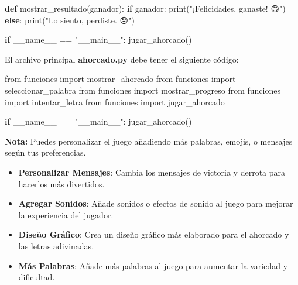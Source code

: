 \documentclass[
  a4paper,
  DIV=11,
  numbers=noendperiod,
  onepage,
  openany]{scrreprt}
\newenvironment{Shaded}{\begin{snugshade}}{\end{snugshade}}
\newcommand{\BuiltInTok}[1]{\textcolor[rgb]{0.00,0.23,0.31}{#1}}
\newcommand{\ControlFlowTok}[1]{\textcolor[rgb]{0.00,0.23,0.31}{\textbf{#1}}}
\newcommand{\ImportTok}[1]{\textcolor[rgb]{0.00,0.46,0.62}{#1}}
\newcommand{\KeywordTok}[1]{\textcolor[rgb]{0.00,0.23,0.31}{\textbf{#1}}}
\newcommand{\NormalTok}[1]{\textcolor[rgb]{0.00,0.23,0.31}{#1}}
\newcommand{\OperatorTok}[1]{\textcolor[rgb]{0.37,0.37,0.37}{#1}}
\newcommand{\StringTok}[1]{\textcolor[rgb]{0.13,0.47,0.30}{#1}}
\newcommand{\VariableTok}[1]{\textcolor[rgb]{0.07,0.07,0.07}{#1}}
\begin{document}
\begin{Shaded}
\begin{Highlighting}[]
\KeywordTok{def}\NormalTok{ mostrar\_resultado(ganador):}
    \ControlFlowTok{if}\NormalTok{ ganador:}
        \BuiltInTok{print}\NormalTok{(}\StringTok{"¡Felicidades, ganaste! 😄"}\NormalTok{)}
    \ControlFlowTok{else}\NormalTok{:}
        \BuiltInTok{print}\NormalTok{(}\StringTok{"Lo siento, perdiste. 😞"}\NormalTok{)}

\ControlFlowTok{if} \VariableTok{\_\_name\_\_} \OperatorTok{==} \StringTok{"\_\_main\_\_"}\NormalTok{:}
\NormalTok{    jugar\_ahorcado()}
\end{Highlighting}
\end{Shaded}

El archivo principal \textbf{ahorcado.py} debe tener el siguiente
código:

\begin{Shaded}
\begin{Highlighting}[]
\ImportTok{from}\NormalTok{ funciones }\ImportTok{import}\NormalTok{ mostrar\_ahorcado}
\ImportTok{from}\NormalTok{ funciones }\ImportTok{import}\NormalTok{ seleccionar\_palabra}
\ImportTok{from}\NormalTok{ funciones }\ImportTok{import}\NormalTok{ mostrar\_progreso}
\ImportTok{from}\NormalTok{ funciones }\ImportTok{import}\NormalTok{ intentar\_letra}
\ImportTok{from}\NormalTok{ funciones }\ImportTok{import}\NormalTok{ jugar\_ahorcado}

\ControlFlowTok{if} \VariableTok{\_\_name\_\_} \OperatorTok{==} \StringTok{"\_\_main\_\_"}\NormalTok{:}
\NormalTok{    jugar\_ahorcado()}
\end{Highlighting}
\end{Shaded}

\begin{tcolorbox}[enhanced jigsaw, breakable, colframe=quarto-callout-tip-color-frame, toprule=.15mm, left=2mm, leftrule=.75mm, opacityback=0, coltitle=black, opacitybacktitle=0.6, bottomtitle=1mm, colback=white, bottomrule=.15mm, title=\textcolor{quarto-callout-tip-color}{\faLightbulb}\hspace{0.5em}{Tip}, rightrule=.15mm, colbacktitle=quarto-callout-tip-color!10!white, titlerule=0mm, arc=.35mm, toptitle=1mm]

\textbf{Nota:} Puedes personalizar el juego añadiendo más palabras,
emojis, o mensajes según tus preferencias.

\end{tcolorbox}

\begin{itemize}
\item
  \textbf{Personalizar Mensajes}: Cambia los mensajes de victoria y
  derrota para hacerlos más divertidos.
\item
  \textbf{Agregar Sonidos}: Añade sonidos o efectos de sonido al juego
  para mejorar la experiencia del jugador.
\item
  \textbf{Diseño Gráfico}: Crea un diseño gráfico más elaborado para el
  ahorcado y las letras adivinadas.
\item
  \textbf{Más Palabras}: Añade más palabras al juego para aumentar la
  variedad y dificultad.
\end{itemize}
\end{document}
